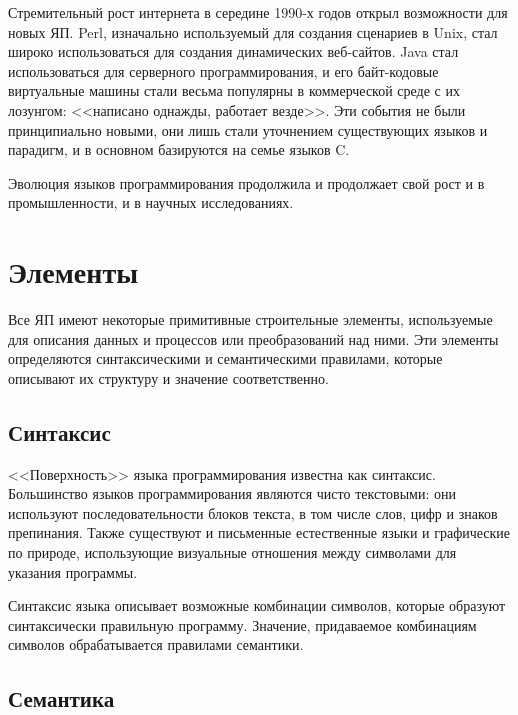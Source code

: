 Стремительный рост интернета в середине 1990-х годов открыл возможности для
новых ЯП. Perl, изначально используемый для создания сценариев в Unix, стал
широко использоваться для создания динамических веб-сайтов. Java стал
использоваться для серверного программирования, и его байт-кодовые виртуальные
машины стали весьма популярны в коммерческой среде с их лозунгом: <<написано
однажды, работает везде>>. Эти события не были принципиально новыми, они лишь
стали уточнением существующих языков и парадигм, и в основном базируются на
семье языков C.

Эволюция языков программирования продолжила и продолжает свой рост и в
промышленности, и в научных исследованиях.

\chapter{Элементы}
Все ЯП имеют некоторые примитивные строительные элементы, используемые для
описания данных и процессов или преобразований над ними. Эти элементы
определяются синтаксическими и семантическими правилами, которые описывают их
структуру и значение соответственно.

\section{Синтаксис}
<<Поверхность>> языка программирования известна как синтаксис. Большинство
языков программирования являются чисто текстовыми: они используют
последовательности блоков текста, в том числе слов, цифр и знаков препинания.
Также существуют и письменные естественные языки и графические по природе,
использующие визуальные отношения между символами для указания программы.

Синтаксис языка описывает возможные комбинации символов, которые образуют
синтаксически правильную программу. Значение, придаваемое комбинациям символов
обрабатывается правилами семантики.

\section{Семантика}
\vspace{-1em}
